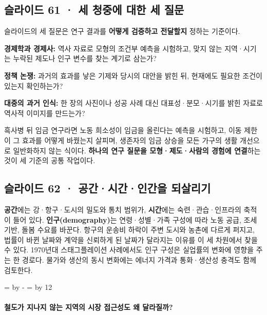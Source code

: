 \documentclass[10pt,a4paper]{article}
\newcommand{\ReserveQuestionSpace}{%
  \par\begingroup
  \dimen0=\pagegoal \advance\dimen0 by -\pagetotal
  \dimen2=\baselineskip \multiply\dimen2 by 12
  \ifdim\dimen0<\dimen2 \newpage\fi
  \endgroup}
\begin{document}
\subsection{슬라이드 61 · 세 청중에 대한 세 질문}
슬라이드의 세 질문은 연구 결과를 \textbf{어떻게 검증하고 전달할지} 정하는 기준이다.\par

\noindent\textbullet \textbf{경제학과 경제사:} 역사 자료로 모형의 조건부 예측을 시험하고, 맞지 않는 지역·시기는 누락된 제도나 인구 변수를 찾는 계기로 삼는가?\par
\noindent\textbullet \textbf{정책 논쟁:} 과거의 효과를 낳은 기제와 당시의 대안을 밝힌 뒤, 현재에도 필요한 조건이 있는지 확인하는가?\par
\noindent\textbullet \textbf{대중의 과거 인식:} 한 장의 사진이나 성공 사례 대신 대표성·분모·시기를 밝힌 자료로 역사적 이미지를 만드는가?\par

흑사병 뒤 임금 연구라면 노동 희소성이 임금을 올린다는 예측을 시험하고, 이동 제한이 그 효과를 어떻게 바꿨는지 살피며, 생존자의 임금 상승을 모든 가구의 생활 개선으로 일반화하지 않는 식이다. \textbf{하나의 연구 질문을 모형·제도·사람의 경험에 연결}하는 것이 세 기준의 공통 작업이다.\par

\subsection{슬라이드 62 · 공간·시간·인간을 되살리기}
\textbf{공간}에는 강·항구·도시의 밀도와 통치 범위가, \textbf{시간}에는 숙련·관습·인프라의 축적이 들어 있다. \textbf{인구(demography)}는 연령·성별·가족 구성에 따라 노동 공급, 조세 기반, 돌봄 수요를 바꾼다. 항구의 운송비 하락이 주변 도시와 농촌에 다르게 퍼지고, 법률이 바뀐 날짜와 계약을 신뢰하게 된 날짜가 달라지는 이유를 이 세 차원에서 찾을 수 있다. 1970년대 스태그플레이션 사례에서도 인구 구성은 실업률의 변화에 영향을 주는 한 경로다. 물가와 생산의 동시 변화에는 에너지 가격과 통화·생산성 충격도 함께 검토한다.\par

\ReserveQuestionSpace
\paragraph{철도가 지나지 않는 지역의 시장 접근성도 왜 달라질까?}
\end{document}
